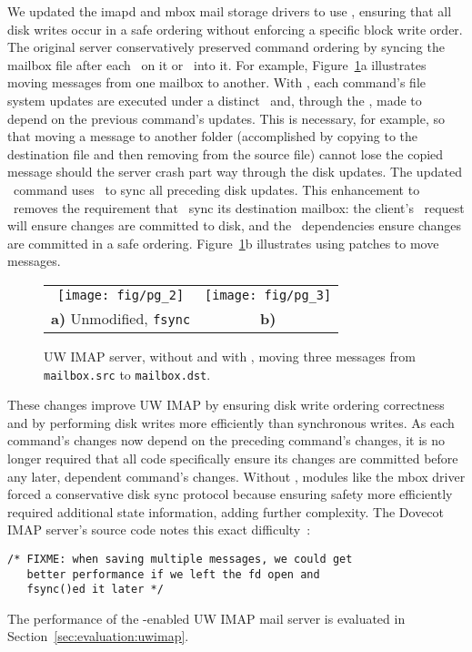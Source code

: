 We updated the imapd and mbox mail storage drivers to use
\patchgroups, ensuring that all disk writes occur in a safe ordering
without enforcing a specific block write order.
%
The original server conservatively preserved command ordering by
syncing the mailbox file after each \imapCheck\ on it or \imapCopy\ into it.
%
For example, Figure~\ref{fig:imap}a illustrates moving messages from
one mailbox to another.
%
With \patchgroups, each command's file system updates are executed under a
distinct \patchgroup\ and, through the \patchgroup, made to depend on the
previous command's updates. This is necessary, for example, so that
moving a message to another folder (accomplished by copying to the
destination file and then removing from the source file) cannot lose
the copied message should the server crash part way through the disk
updates.
%
The updated \imapCheck\ command uses \pgSync\ to sync all preceding disk
updates. This enhancement to \imapCheck\ removes the requirement that \imapCopy\
sync its destination mailbox: the client's \imapCheck\ request will ensure
changes are committed to disk, and the \patchgroup\ dependencies ensure
changes are committed in a safe ordering.
%
Figure~\ref{fig:imap}b illustrates using patches to move messages.

\begin{figure}[tb]
\centering
\begin{tabular}{@{}cc@{}}
\texttt{[image: fig/pg\_2]} & 
\texttt{[image: fig/pg\_3]}\\
\textbf{a)} Unmodified, \texttt{fsync} & 
\textbf{b)} \Patchgroups
\end{tabular}
\caption{UW IMAP server, without and with \patchgroups, moving three
messages from \texttt{mailbox.src} to \texttt{mailbox.dst}.}
\label{fig:imap}
\end{figure}

These changes improve UW IMAP by
%
ensuring disk write ordering correctness
%
and by performing disk writes more efficiently than synchronous writes.
%
As each command's changes now depend on the preceding command's
changes, it is no longer required that all code
specifically ensure its changes are committed before any later, dependent
command's changes. Without \patchgroups, modules like the mbox driver
forced a conservative disk sync protocol because ensuring safety more
efficiently required additional state information, adding further
complexity. The Dovecot IMAP server's source code notes this exact
difficulty~\cite[maildir-save.c]{dovecot}:

\vspace{-0.5\baselineskip}
\begin{scriptsize}
\begin{verbatim}
/* FIXME: when saving multiple messages, we could get
   better performance if we left the fd open and
   fsync()ed it later */
\end{verbatim}
\end{scriptsize}
\vspace{-0.5\baselineskip}

The performance of the \patchgroup{}-enabled UW IMAP mail server is
evaluated in Section~\ref{sec:evaluation:uwimap}.
